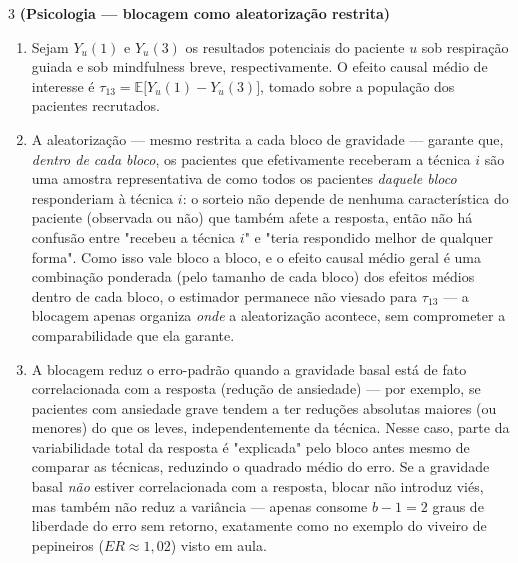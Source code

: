 \documentclass[11pt]{article}
\begin{document}
\begin{questao}{3} \textbf{(Psicologia --- blocagem como aleatorização restrita)}
\end{questao}
\begin{solucao}
\begin{enumerate}[label=(\alph*)]
  \item Sejam $Y_u(1)$ e $Y_u(3)$ os resultados potenciais do paciente $u$ sob respiração guiada e
    sob mindfulness breve, respectivamente. O efeito causal médio de interesse é
    $\tau_{13}=\mathbb E\big[Y_u(1)-Y_u(3)\big]$, tomado sobre a população dos pacientes
    recrutados.
  \item A aleatorização — mesmo restrita a cada bloco de gravidade — garante que, \emph{dentro de
    cada bloco}, os pacientes que efetivamente receberam a técnica $i$ são uma amostra
    representativa de como todos os pacientes \emph{daquele bloco} responderiam à técnica $i$: o
    sorteio não depende de nenhuma característica do paciente (observada ou não) que também afete
    a resposta, então não há confusão entre "recebeu a técnica $i$" e "teria respondido melhor de
    qualquer forma". Como isso vale bloco a bloco, e o efeito causal médio geral é uma combinação
    ponderada (pelo tamanho de cada bloco) dos efeitos médios dentro de cada bloco, o estimador
    permanece não viesado para $\tau_{13}$ — a blocagem apenas organiza \emph{onde} a
    aleatorização acontece, sem comprometer a comparabilidade que ela garante.
  \item A blocagem reduz o erro-padrão quando a gravidade basal está de fato correlacionada com a
    resposta (redução de ansiedade) — por exemplo, se pacientes com ansiedade grave tendem a ter
    reduções absolutas maiores (ou menores) do que os leves, independentemente da técnica. Nesse
    caso, parte da variabilidade total da resposta é "explicada" pelo bloco antes mesmo de
    comparar as técnicas, reduzindo o quadrado médio do erro. Se a gravidade basal \emph{não}
    estiver correlacionada com a resposta, blocar não introduz viés, mas também não reduz a
    variância — apenas consome $b-1=2$ graus de liberdade do erro sem retorno, exatamente como no
    exemplo do viveiro de pepineiros ($ER\approx1{,}02$) visto em aula.
\end{enumerate}
\end{solucao}
\end{document}
